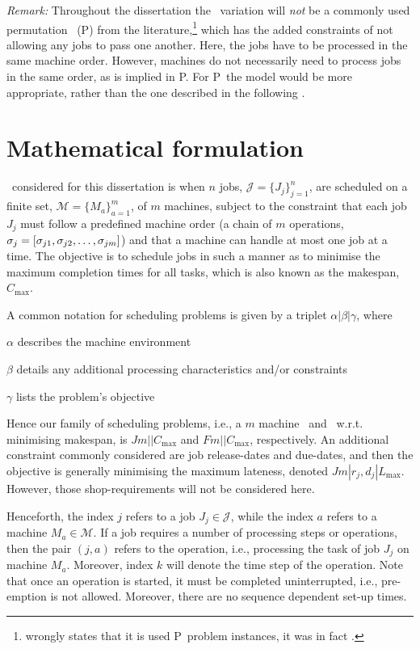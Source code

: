 \emph{Remark:} Throughout the dissertation the \FSP\ variation will \emph{not} 
be a commonly used permutation \fsp\ (P\FSP) from the 
literature,\footnote{ wrongly states that it is used P\FSP\ problem
    instances, it was in fact \FSP.} 
which has the added constraints of not allowing any jobs to pass one another.
Here, the jobs have to be processed in the same machine order. However, 
machines do not necessarily need to process jobs in the same order, as is 
implied in P\FSP. For P\FSP\ the \citet{Manne60} model would be more 
appropriate, rather than the one described in the following 
.

\section{Mathematical formulation}\label{jsp:MIP}
\Jsp\ considered for this dissertation is when $n$ jobs, 
$\mathcal{J}=\{J_j\}_{j=1}^n$, are scheduled on a finite set, 
$\mathcal{M}=\{M_a\}_{a=1}^m$, of $m$ machines, subject to the constraint that 
each job $J_j$ must follow a predefined machine order (a chain of 
$m$ operations, ${\mathbf{\sigma}}_j=[\sigma_{j1},\sigma_{j2},\dotsc,\sigma_{jm}]$) and 
that a machine can handle at most one job at a time. 
The objective is to schedule jobs in such a manner as to minimise the maximum 
completion times for all tasks, which is also known as the makespan, 
$C_{\max}$. 

A common notation for scheduling problems \citep[cf. Chapter 2 in ][]{Pinedo08} 
is given by a triplet $\alpha|\beta|\gamma$, where 
\begin{enumerate*}[itemjoin*={, and finally}, label={{}}]
    \item $\alpha$ describes the machine environment
    \item $\beta$ details any additional processing characteristics and/or 
    constraints
    \item $\gamma$ lists the problem's objective
\end{enumerate*}
Hence our family of scheduling problems, i.e., a $m$ machine \JSP\ and \FSP\ 
w.r.t. minimising makespan, is $Jm||C_{\max}$ and $Fm||C_{\max}$, respectively. 
An additional constraint commonly considered are job release-dates and 
due-dates, and then the objective is generally minimising the maximum lateness, 
denoted $Jm|r_j,d_j|L_{\max}$. 
However, those shop-requirements will not be considered here. 

Henceforth, the index $j$ refers to a job $J_j\in\mathcal{J}$, while the index 
$a$ refers to a machine $M_a\in\mathcal{M}$. If a job requires a number of 
processing steps or operations, then the pair $(j,a)$ refers to the operation, 
i.e., processing the task of job $J_j$ on machine $M_a$. Moreover, index $k$ 
will denote the time step of the operation. Note that once an operation is 
started, it must be completed uninterrupted, i.e., pre-emption is not allowed. 
Moreover, there are no sequence dependent set-up times.


